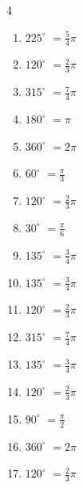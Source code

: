 \begin{multicols}{4}
\begin{enumerate}
  \item $\displaystyle 225^{\circ}$
        $\displaystyle =\frac{5}{4}\pi$

  \item $\displaystyle 120^{\circ}$
        $\displaystyle =\frac{2}{3}\pi$

  \item $\displaystyle 315^{\circ}$
        $\displaystyle =\frac{7}{4}\pi$

  \item $\displaystyle 180^{\circ}$
        $\displaystyle =\pi$

  \item $\displaystyle 360^{\circ}$
        $\displaystyle =2\pi$

  \item $\displaystyle 60^{\circ}$
        $\displaystyle =\frac{\pi}{3}$

  \item $\displaystyle 120^{\circ}$
        $\displaystyle =\frac{2}{3}\pi$

  \item $\displaystyle 30^{\circ}$
        $\displaystyle =\frac{\pi}{6}$

  \item $\displaystyle 135^{\circ}$
        $\displaystyle =\frac{3}{4}\pi$

  \item $\displaystyle 135^{\circ}$
        $\displaystyle =\frac{3}{4}\pi$

  \item $\displaystyle 120^{\circ}$
        $\displaystyle =\frac{2}{3}\pi$

  \item $\displaystyle 315^{\circ}$
        $\displaystyle =\frac{7}{4}\pi$

  \item $\displaystyle 135^{\circ}$
        $\displaystyle =\frac{3}{4}\pi$

  \item $\displaystyle 120^{\circ}$
        $\displaystyle =\frac{2}{3}\pi$

  \item $\displaystyle 90^{\circ}$
        $\displaystyle =\frac{\pi}{2}$

  \item $\displaystyle 360^{\circ}$
        $\displaystyle =2\pi$

  \item $\displaystyle 120^{\circ}$
        $\displaystyle =\frac{2}{3}\pi$


\end{enumerate}
\end{multicols}
